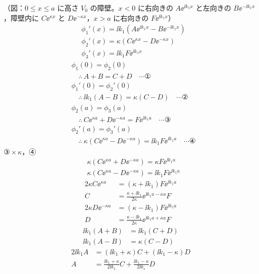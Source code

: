 （図：$0\le x\le a$ に高さ $V_{0}$ の障壁。$x<0$ に右向きの $A\ee^{\ii k_{1}x}$ と左向きの $B\ee^{-\ii k_{1}x}$，障壁内に $C\ee^{\kappa x}$ と $D\ee^{-\kappa x}$，$x>a$ に右向きの $F\ee^{\ii k_{1}x}$）
\begin{align*}
&\phi_{1}'(x)=\ii k_{1}(A\ee^{\ii k_{1}x}-B\ee^{-\ii k_{1}x})\\
&\phi_{2}'(x)=\kappa(C\ee^{\kappa x}-D\ee^{-\kappa x})\\
&\phi_{3}'(x)=\ii k_{1}F\ee^{\ii k_{1}x}
\end{align*}
\begin{align*}
&\phi_{1}(0)=\phi_{2}(0)\\
&\quad\therefore\ A+B=C+D\quad\cdots\text{①}\\
&\phi_{1}'(0)=\phi_{2}'(0)\\
&\quad\therefore\ \ii k_{1}(A-B)=\kappa(C-D)\quad\cdots\text{②}\\
&\phi_{2}(a)=\phi_{3}(a)\\
&\quad\therefore\ C\ee^{\kappa a}+D\ee^{-\kappa a}=F\ee^{\ii k_{1}a}\quad\cdots\text{③}\\
&\phi_{2}'(a)=\phi_{3}'(a)\\
&\quad\therefore\ \kappa(C\ee^{\kappa a}-D\ee^{-\kappa a})=\ii k_{1}F\ee^{\ii k_{1}a}\quad\cdots\text{④}
\end{align*}
③${}\times\kappa$，④
\begin{align*}
&\kappa(C\ee^{\kappa a}+D\ee^{-\kappa a})=\kappa F\ee^{\ii k_{1}a}\\
&\kappa(C\ee^{\kappa a}-D\ee^{-\kappa a})=\ii k_{1}F\ee^{\ii k_{1}a}
\end{align*}
\begin{align*}
2\kappa C\ee^{\kappa a}&=(\kappa+\ii k_{1})F\ee^{\ii k_{1}a}\\
C&=\frac{\kappa+\ii k_{1}}{2\kappa}\ee^{\ii k_{1}a-\kappa a}F\\
2\kappa D\ee^{-\kappa a}&=(\kappa-\ii k_{1})F\ee^{\ii k_{1}a}\\
D&=\frac{\kappa-\ii k_{1}}{2\kappa}\ee^{\ii k_{1}a+\kappa a}F
\end{align*}
\begin{align*}
\ii k_{1}(A+B)&=\ii k_{1}(C+D)\\
\ii k_{1}(A-B)&=\kappa(C-D)
\end{align*}
\begin{align*}
2\ii k_{1}A&=(\ii k_{1}+\kappa)C+(\ii k_{1}-\kappa)D\\
A&=\frac{\ii k_{1}+\kappa}{2\ii k_{1}}C+\frac{\ii k_{1}-\kappa}{2\ii k_{1}}D
\end{align*}
